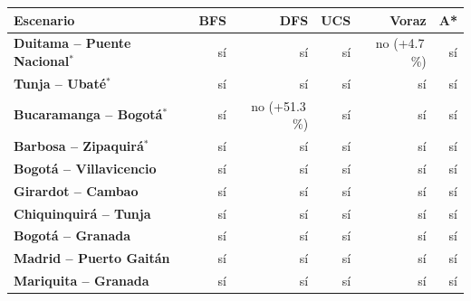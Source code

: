 \renewcommand{\arraystretch}{1.2}
\begin{tabular}{|l|r|r|r|r|r|}
\hline
\rowcolor{gray!20} \textbf{Escenario} & \textbf{BFS} & \textbf{DFS} & \textbf{UCS} & \textbf{Voraz} & \textbf{A*} \\
\hline
\textbf{Duitama -- Puente Nacional$^{*}$} & sí & sí & sí & no (+4.7\,\%) & sí \\
\hline
\textbf{Tunja -- Ubaté$^{*}$} & sí & sí & sí & sí & sí \\
\hline
\textbf{Bucaramanga -- Bogotá$^{*}$} & sí & no (+51.3\,\%) & sí & sí & sí \\
\hline
\textbf{Barbosa -- Zipaquirá$^{*}$} & sí & sí & sí & sí & sí \\
\hline
\textbf{Bogotá -- Villavicencio} & sí & sí & sí & sí & sí \\
\hline
\textbf{Girardot -- Cambao} & sí & sí & sí & sí & sí \\
\hline
\textbf{Chiquinquirá -- Tunja} & sí & sí & sí & sí & sí \\
\hline
\textbf{Bogotá -- Granada} & sí & sí & sí & sí & sí \\
\hline
\textbf{Madrid -- Puerto Gaitán} & sí & sí & sí & sí & sí \\
\hline
\textbf{Mariquita -- Granada} & sí & sí & sí & sí & sí \\
\hline
\end{tabular}
